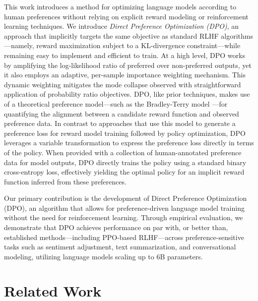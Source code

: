 This work introduces a method for optimizing language models according to human preferences without relying on explicit reward modeling or reinforcement learning techniques. We introduce \textit{{Direct Preference Optimization} (DPO)}, an approach that implicitly targets the same objective as standard RLHF algorithms—namely, reward maximization subject to a KL-divergence constraint—while remaining easy to implement and efficient to train. At a high level, DPO works by amplifying the log-likelihood ratio of preferred over non-preferred outputs, yet it also employs an adaptive, per-sample importance weighting mechanism. This dynamic weighting mitigates the mode collapse observed with straightforward application of probability ratio objectives. DPO, like prior techniques, makes use of a theoretical preference model—such as the Bradley-Terry model \cite{bradley1952rankanalysis}—for quantifying the alignment between a candidate reward function and observed preference data. In contrast to approaches that use this model to generate a preference loss for reward model training followed by policy optimization, DPO leverages a variable transformation to express the preference loss directly in terms of the policy. When provided with a collection of human-annotated preference data for model outputs, DPO directly trains the policy using a standard binary cross-entropy loss, effectively yielding the optimal policy for an implicit reward function inferred from these preferences.

Our primary contribution is the development of Direct Preference Optimization (DPO), an algorithm that allows for preference-driven language model training without the need for reinforcement learning. Through empirical evaluation, we demonstrate that DPO achieves performance on par with, or better than, established methods—including PPO-based RLHF—across preference-sensitive tasks such as sentiment adjustment, text summarization, and conversational modeling, utilizing language models scaling up to 6B parameters.

\section{Related Work}

